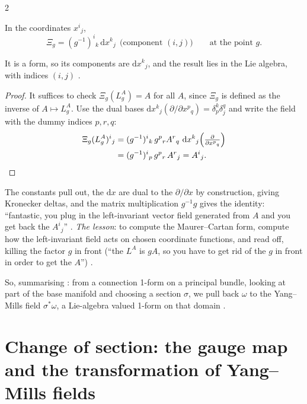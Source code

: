\begin{paracol}{2}
\begin{coursenote}
\end{coursenote}
\begin{proposition}\label{prop:ym-mc-gl}
In the coordinates $x^i{}_j$,
\[
  \Xi_g=(g^{-1})^i{}_k\,\mathrm dx^k{}_j\ \ \text{(component $(i,j)$)}\qquad\text{at the point }g .
\]
   
\end{proposition}
 It is a form, so its components are $\mathrm dx^k{}_j$, and the result lies in the Lie algebra, with indices $(i,j)$ .
\begin{proof}
It suffices to check $\Xi_g(L^A_g)=A$ for all $A$, since $\Xi_g$ is defined as the inverse of $A\mapsto L^A_g$. Use the dual bases $\mathrm dx^k{}_j(\partial/\partial x^p{}_q)=\delta^k_p\delta_j^q$ and write the field with the dummy indices $p,r,q$:
\[
  \begin{aligned}
  \Xi_g(L^A_g)^i{}_j&=(g^{-1})^i{}_k\,g^p{}_rA^r{}_q\ \mathrm dx^k{}_j\Bigl(\tfrac{\partial}{\partial x^p{}_q}\Bigr)\\
  &=(g^{-1})^i{}_p\,g^p{}_r\,A^r{}_j=A^i{}_j .
  \end{aligned}
\]
    
\end{proof}
The constants pull out, the $\mathrm dx$ are dual to the $\partial/\partial x$ by construction, giving Kronecker deltas, and the matrix multiplication $g^{-1}g$ gives the identity: ``fantastic, you plug in the left-invariant vector field generated from $A$ and you get back the $A^i{}_j$''   . \emph{The lesson}: to compute the Maurer--Cartan form, compute how the left-invariant field acts on chosen coordinate functions, and read off, killing the factor $g$ in front (``the $L^A$ is $gA$, so you have to get rid of the $g$ in front in order to get the $A$'')  .

So, summarising  : from a connection 1-form on a principal bundle, looking at part of the base manifold and choosing a section $\sigma$, we pull back $\omega$ to the Yang--Mills field $\sigma^*\omega$, a Lie-algebra valued 1-form on that domain .

\section{Change of section: the gauge map and the transformation of Yang--Mills fields}\label{sec:ym-gauge}


\end{paracol}
